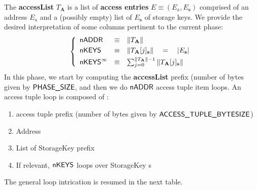 The \textbf{accessList} $T_\textbf{A}$ is a list of \textbf{access entries} $E \equiv (E_\text{a}, E_\textbf{s})$ comprised of an address $E_\text{a}$ and a (possibly empty) list of $E_\textbf{s}$ of storage keys.
We provide the desired interpretation of some columns pertinent to the current phase:
\[
	\left\{ \begin{array}{lclcl}
		\nbAddr                    & \equiv & \| T_\textbf{A} \|               \vspace{1mm}                              \\
		\nStorageKeysInAccessEntry & \equiv & \| T_\textbf{A}[j]_\textbf{s} \| \vspace{1mm} \quad = \quad |E_\textbf{s}| \\
		\nStorageKeysInAccessList  & \equiv & \sum_{j = 0}^{\| T_\textbf{A} \| - 1} \| T_\textbf{A}[j]_\textbf{s} \|     \\
	\end{array} \right.
\]
In this phase, we start by computing the \textbf{accessList} \rlp{} prefix (number of bytes given by $\textsf{PHASE\_SIZE}$, and then we do $\textsf{nADDR}$ access tuple item loops.
An access tuple loop is composed of :
\begin{enumerate}
	\item access tuple \rlp{} prefix (number of bytes given by $\textsf{ACCESS\_TUPLE\_BYTESIZE}$)
	\item Address \rlp{}
	\item List of StorageKey \rlp{} prefix
	\item If relevant, $\textsf{nKEYS}$ loops over StorageKey \rlp{}s 
\end{enumerate}
The general loop intrication is resumed in the next table.
